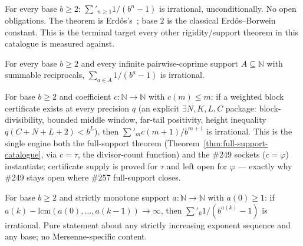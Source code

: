 \begin{thm}
\label{thm:full-support-catalogue}
For every base $b\ge 2$: $\sum'_{n\ge 1} 1/(b^n-1)$ is irrational, unconditionally. No
open obligations. The theorem is Erd\H{o}s's~\cite{erdos1948}; base $2$ is the classical
Erd\H{o}s--Borwein constant. This is the
terminal target every other rigidity/support theorem in this catalogue is measured
against.
\par{}
\end{thm}

\begin{thm}
\label{thm:pairwise-coprime}
For every base $b\ge 2$ and every infinite pairwise-coprime support $A\subseteq\mathbb N$
with summable reciprocals, $\sum_{a\in A} 1/(b^a-1)$ is irrational.
\par{}
\end{thm}

\begin{thm}
\label{thm:weighted-coeff-engine}
For base $b\ge 2$ and coefficient $c:\mathbb N\to\mathbb N$ with $c(m)\le m$: if a
weighted block certificate exists at every precision $q$ (an explicit
$\exists N,K,L,C$ package: block-divisibility, bounded middle window, far-tail
positivity, height inequality $q(C+N+L+2)<b^L$), then $\sum'_m c(m{+}1)/b^{m+1}$ is
irrational. This is the single engine both the full-support theorem
(Theorem~\ref{thm:full-support-catalogue}, via $c=\tau$, the divisor-count function) and the
\#249 sockets ($c=\varphi$) instantiate; certificate supply is proved for $\tau$
and left open for $\varphi$ — exactly why \#249 stays open where \#257 full-support
closes.
\par{}
\end{thm}

\begin{thm}
\label{thm:lcm-gap-engine}
For base $b\ge 2$ and strictly monotone support $a:\mathbb N\to\mathbb N$ with $a(0)\ge
1$: if $a(k)-\mathrm{lcm}(a(0),\dots,a(k-1))\to\infty$, then $\sum'_k 1/(b^{a(k)}-1)$ is
irrational. Pure statement about any strictly increasing exponent sequence and any base;
no Mersenne-specific content.
\par{}
\end{thm}

